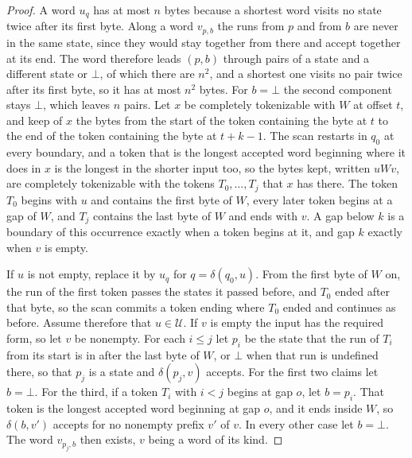 \documentclass[11pt,a4paper]{article}
\theoremstyle{definition}
\theoremstyle{plain}
\begin{document}
\begin{proof}
A word $u_q$ has at most $n$ bytes because a shortest word visits no state twice after its first byte. Along a word
$v_{p,b}$ the runs from $p$ and from $b$ are never in the same state, since they would stay together from there and
accept together at its end. The word therefore leads $(p, b)$ through pairs of a state and a different state or $\bot$,
of which there are $n^2$, and a shortest one visits no pair twice after its first byte, so it has at most $n^2$ bytes.
For $b = \bot$ the second component stays $\bot$, which leaves $n$ pairs. Let $x$ be completely tokenizable with $W$ at
offset $t$, and keep of $x$ the bytes from the start of the token containing the byte at $t$ to the end of the token
containing the byte at $t + k - 1$. The scan restarts in $q_0$ at every boundary, and a token that is the longest
accepted word beginning where it does in $x$ is the longest in the shorter input too, so the bytes kept, written
$u W v$, are completely tokenizable with the tokens $T_0, \ldots, T_j$ that $x$ has there. The token $T_0$ begins with
$u$ and contains the first byte of $W$, every later token begins at a gap of $W$, and $T_j$ contains the last byte of
$W$ and ends with $v$. A gap below $k$ is a boundary of this occurrence exactly when a token begins at it, and gap $k$
exactly when $v$ is empty.

If $u$ is not empty, replace it by $u_q$ for $q = \delta(q_0, u)$. From the first byte of $W$ on, the run of the first
token passes the states it passed before, and $T_0$ ended after that byte, so the scan commits a token ending where
$T_0$ ended and continues as before. Assume therefore that $u \in \mathcal{U}$. If $v$ is empty the input has the
required form, so let $v$ be nonempty. For each $i \leq j$ let $p_i$ be the state that the run of $T_i$ from its start
is in after the last byte of $W$, or $\bot$ when that run is undefined there, so that $p_j$ is a state and
$\delta(p_j, v)$ accepts. For the first two claims let $b = \bot$. For the third, if a token $T_i$ with $i < j$ begins
at gap $o$, let $b = p_i$. That token is the longest accepted word beginning at gap $o$, and it ends inside $W$, so
$\delta(b, v')$ accepts for no nonempty prefix $v'$ of $v$. In every other case let $b = \bot$. The word $v_{p_j, b}$
then exists, $v$ being a word of its kind.


\end{proof}
\end{document}
